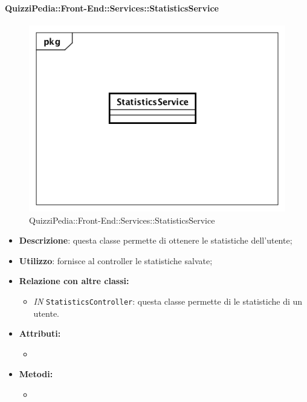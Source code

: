 \paragraph{QuizziPedia::Front-End::Services::StatisticsService}
\begin{figure}
	\centering
	\includegraphics[scale=0.45]{UML/Classi/Front-End/QuizziPedia_Front-end_Services_ StatisticsService.png}
	\caption{QuizziPedia::Front-End::Services::StatisticsService}
\end{figure}
\begin{itemize}
	\item \textbf{Descrizione}: questa classe permette di ottenere le statistiche dell'utente;
	\item \textbf{Utilizzo}: fornisce al controller le statistiche salvate;
	\item \textbf{Relazione con altre classi:}
	\begin{itemize}
		\item \textit{IN} \texttt{StatisticsController}: questa classe permette di le statistiche di un utente.
	\end{itemize}
	\item \textbf{Attributi:}
	\begin{itemize}
		\item 
	\end{itemize}
	\item \textbf{Metodi:}
	\begin{itemize}
		\item 
	\end{itemize}
\end{itemize}

